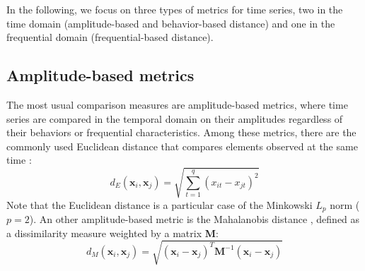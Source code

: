 In the following, we focus on three types of metrics for time series, two in the time domain (amplitude-based and behavior-based distance) and one in the frequential domain (frequential-based distance).






\subsection{Amplitude-based metrics}
\label{sec:TSmetrics}

The most usual comparison measures are amplitude-based metrics, where time series are compared in the temporal domain on their amplitudes regardless of their behaviors or frequential characteristics. Among these metrics, there are the commonly used Euclidean distance that compares elements observed at the same time \cite{Ding2008}: 
\begin{equation}	
	d_E(\textbf{x}_i,\textbf{x}_j) = \sqrt{\sum\limits_{t=1}^{q} (x_{it}-x_{jt})^2}
\label{eq:A}
\end{equation}
Note that the Euclidean distance is a particular case of the Minkowski $L_p$ norm ($p=2$). An other amplitude-based metric is the Mahalanobis distance \cite{Prekopcsak2012}, defined as a dissimilarity measure weighted by a matrix \textbf{M}:
\begin{equation}	
	d_M(\textbf{x}_i,\textbf{x}_j) = \sqrt{(\textbf{x}_i-\textbf{x}_j)^T\textbf{M}^{-1}(\textbf{x}_i-\textbf{x}_j)}
	\label{eq:dM}
\end{equation}

